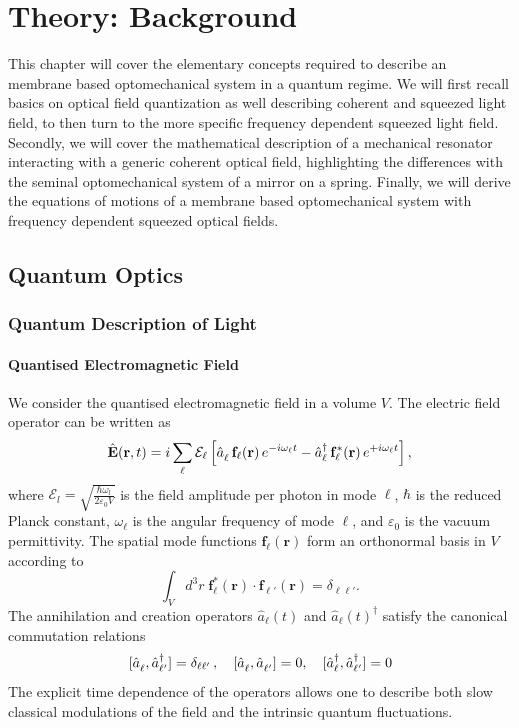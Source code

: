 \newcommand{\adag}[1]{\hat{a}_{#1}^\dagger}
\newcommand{\aop}[1]{\hat{a}_{#1\vphantom{\dagger}}}
\chapter{Theory: Background}
This chapter will cover the elementary concepts required to describe an membrane based optomechanical system in a quantum regime. We will first recall basics on optical field quantization as well describing coherent and squeezed light field, to then turn to the more specific frequency dependent squeezed light field. Secondly, we will cover the mathematical description of a mechanical resonator interacting with a generic coherent optical field, highlighting the differences with the seminal optomechanical system of a mirror on a spring. Finally, we will derive the equations of motions of a membrane based optomechanical system with frequency dependent squeezed optical fields. 
\minitoc
\newpage
\section{Quantum Optics}
\subsection{Quantum Description of Light}

\subsubsection{Quantised Electromagnetic Field}
We consider the quantised electromagnetic field in a volume $V$. The electric field operator can be written as  
\begin{equation}
\hat{\mathbf{E}}(\mathbf{r}, t) 
= i \sum_{\ell} \mathcal{E}_\ell 
\left[ \hat{a}^{\vphantom{\dagger}}_{\ell}\,\mathbf{f}_{\ell}(\mathbf{r})\,e^{-i\omega_{\ell} t} 
- \hat{a}_{\ell}^\dagger\,\mathbf{f}_{\ell}^*(\mathbf{r})\,e^{+i\omega_{\ell} t} \right],
\end{equation}
where   $\mathcal{E}_l = \sqrt{\frac{\hbar \omega_l}{2 \varepsilon_0 V}}$ is the field amplitude per photon in mode $\ell$, $\hbar$ is the reduced Planck constant, $\omega_\ell$ is the angular frequency of mode $\ell$, and $\varepsilon_0$ is the vacuum permittivity. The spatial mode functions $\mathbf{f}_{\ell}(\mathbf{r})$ form an orthonormal basis in $V$ according to  
\begin{equation*}
\int_V d^3r\; \mathbf{f}_{\ell}^*(\mathbf{r}) \cdot \mathbf{f}_{\ell'}(\mathbf{r}) 
= \delta_{\ell \ell'} .
\end{equation*}
The annihilation and creation operators $\hat{a}_{\ell}(t)$ and $\hat{a}_{\ell}(t)^\dagger$ satisfy the canonical commutation relations  
\[
[\hat{a}_{\ell}^{\vphantom{\dagger}}, \hat{a}_{\ell'}^\dagger] = \delta_{\ell \ell'} \,, \quad
[\hat{a}_{\ell}^{\vphantom{\dagger}}, \hat{a}_{\ell'}^{\vphantom{\dagger}} ] = 0, \quad [\hat{a}_{\ell}^\dagger, \hat{a}_{\ell'}^\dagger] = 0  
\]
The explicit time dependence of the operators allows one to describe both slow classical modulations of the field and the intrinsic quantum fluctuations.

